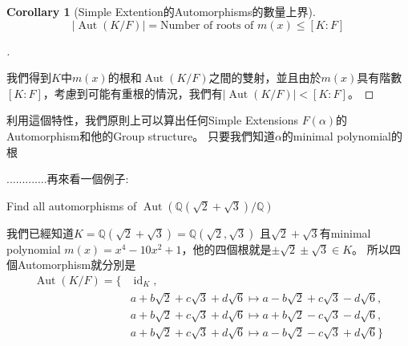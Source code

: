 \documentclass[12pt]{article}
\theoremstyle{definition}
\newtheorem{cor}{Corollary}
\newtheorem{prop}{Proposition}
\newenvironment{proofs}[1][\proofname]{%
  \begin{proof}[#1]$ $\par\nobreak\ignorespaces
}{%
  \end{proof}
}
\newcommand{\QQ}{\mathbb Q}
\DeclareMathOperator{\Aut}{Aut}
\DeclareMathOperator{\id}{id}
\begin{document}
\begin{cor}[Simple Extention的Automorphisms的數量上界]
	$$\left|\Aut(K/F)\right|=\text{Number of roots of $m(x)$}\le [K:F]$$
\end{cor}
\begin{proofs}
	我們得到$K$中$m(x)$的根和$\Aut(K/F)$之間的雙射，並且由於$m(x)$具有階數$[K: F]$，考慮到可能有重根的情況，我們有$\left|\Aut(K/F)\right| < [K: F]$。
\end{proofs}

利用這個特性，我們原則上可以算出任何Simple Extensions $F(\alpha)$的Automorphism和他的Group structure。
只要我們知道$\alpha$的minimal polynomial的根

.............再來看一個例子:

\begin{ex} Find all automorphisms of $\Aut(\QQ(\sqrt{2}+\sqrt{3})/\QQ)$

	我們已經知道$K=\QQ(\sqrt2+\sqrt3)=\QQ(\sqrt2,\sqrt3)$
	且$\sqrt2+\sqrt3$有minimal polynomial $m(x)=x^4-10x^2+1$，他的四個根就是$\pm\sqrt{2}\pm\sqrt{3}\in K$。
	所以四個Automorphism就分別是
	\begin{align*}
		\Aut(K/F)=\{
		 & \id_K,                                                                  \\
		 & a+b\sqrt{2}+c\sqrt{3}+d\sqrt{6}\mapsto a-b\sqrt{2}+c\sqrt{3}-d\sqrt{6}, \\
		 & a+b\sqrt{2}+c\sqrt{3}+d\sqrt{6}\mapsto a+b\sqrt{2}-c\sqrt{3}-d\sqrt{6}, \\
		 & a+b\sqrt{2}+c\sqrt{3}+d\sqrt{6}\mapsto a-b\sqrt{2}-c\sqrt{3}+d\sqrt{6}
		\}
	\end{align*}

\end{ex}






\end{document}
